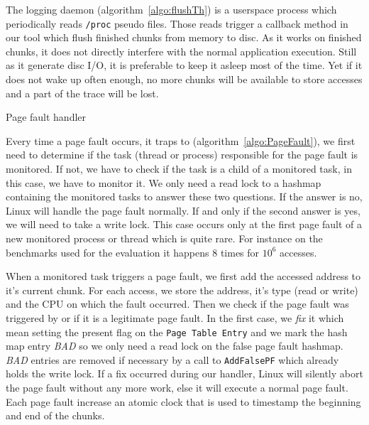 The logging daemon (algorithm~\ref{algo:flushTh}) is a userspace process
which periodically reads \texttt{/proc} pseudo files. Those reads trigger a
callback method in our tool which flush finished chunks from memory to
disc. As it works on finished chunks, it does not directly interfere with the
normal application execution. Still as it generate disc I/O, it is preferable to
keep it asleep most of the time. Yet if it does not wake up often enough, no
more chunks will be available to store accesses and a part of the trace will
be lost.

\begin{algorithm}[htb]
    \caption{Page fault handler}
    \label{algo:PageFault}
    \begin{algorithmic}[1]
                    \State \Return {}
                \EndIf
            \EndIf
            \State {}
            \State {}
            \State {}
            \State {}
            \State {}
            \State {}
        \EndFunction
    \end{algorithmic}
\end{algorithm}

Every time a page fault occurs, it traps to \Moca
(algorithm~\ref{algo:PageFault}), we first need to determine if the task
(thread or process) responsible for the page fault is
monitored. If not, we have to check if the task is a child of a monitored
task, in this case, we have to monitor it. We only need a read lock
to a hashmap containing the monitored tasks to answer these
two questions. If the answer is no, Linux will handle the page
fault normally. If and only if the second answer is yes, we will need to take
a write lock. This case occurs only at the first page fault of a new monitored
process or thread which is quite rare. For instance on the benchmarks used for
the evaluation it happens $8$ times for $10^6$ accesses.

When a monitored task triggers a page fault, we first add the accessed address
to it's current chunk. For each access, we store the address, it's type (read
or write) and the CPU on which the fault occurred.  Then we check if the page
fault was triggered by \Moca or if it is a legitimate page fault. In the first
case, we \emph{fix} it which mean setting the present flag on the \texttt{Page
Table Entry} and we mark the hash map entry \emph{BAD} so we only need a read
lock on the false page fault hashmap. \emph{BAD} entries are removed if
necessary by a call to \texttt{AddFalsePF} which already holds the write lock.
If a fix occurred during our handler, Linux will silently abort the page fault
without any more work, else it will execute a normal page fault. Each page
fault increase an atomic clock that is used to timestamp the beginning and end
of the chunks.

